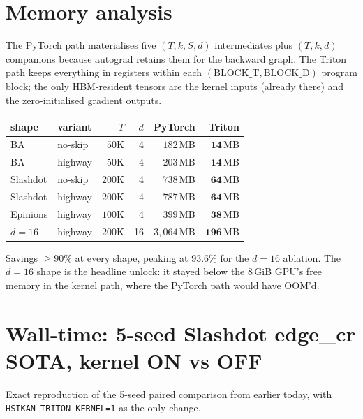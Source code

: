 \documentclass[11pt,a4paper]{article}
\begin{document}
\section{Memory analysis}

The PyTorch path materialises five $(T, k, S, d)$ intermediates plus
$(T, k, d)$ companions because autograd retains them for the
backward graph. The Triton path keeps everything in registers within
each $(\mathrm{BLOCK\_T}, \mathrm{BLOCK\_D})$ program block; the only
HBM-resident tensors are the kernel inputs (already there) and the
zero-initialised gradient outputs.

\begin{center}\small
\begin{tabular}{l l r r r r}
\toprule
\textbf{shape} & \textbf{variant} & \textbf{$T$} & \textbf{$d$}
& \textbf{PyTorch} & \textbf{Triton} \\
\midrule
BA       & no-skip  & $50\text{K}$  & 4   & $182\,$MB    & $\mathbf{14\,}$MB    \\
BA       & highway  & $50\text{K}$  & 4   & $203\,$MB    & $\mathbf{14\,}$MB    \\
Slashdot & no-skip  & $200\text{K}$ & 4   & $738\,$MB    & $\mathbf{64\,}$MB    \\
Slashdot & highway  & $200\text{K}$ & 4   & $787\,$MB    & $\mathbf{64\,}$MB    \\
Epinions & highway  & $100\text{K}$ & 4   & $399\,$MB    & $\mathbf{38\,}$MB    \\
$d{=}16$ & highway  & $200\text{K}$ & 16  & $3{,}064\,$MB & $\mathbf{196\,}$MB \\
\bottomrule
\end{tabular}
\end{center}

Savings $\ge 90\%$ at every shape, peaking at $93.6\%$ for the
$d{=}16$ ablation. The $d{=}16$ shape is the headline unlock: it
stayed below the $8\,$GiB GPU's free memory in the kernel path,
where the PyTorch path would have OOM'd.

\section{Wall-time: 5-seed Slashdot edge\_cr SOTA, kernel ON vs OFF}

Exact reproduction of the 5-seed paired comparison from earlier
today, with \texttt{HSIKAN\_TRITON\_KERNEL=1} as the only change.
\end{document}
